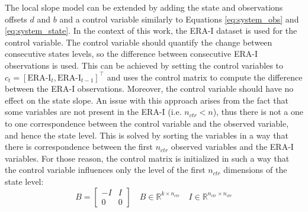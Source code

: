 \documentclass{article}
\begin{document}
The local slope model can be extended by adding the state and observations offsets $d$ and $b$ and a control variable similarly to Equations \ref{eq:system_obs} and \ref{eq:system_state}.
In the context of this work, the ERA-I dataset is used for the control variable. The control variable should quantify the change between consecutive states levels, so the difference between consecutive ERA-I observations is used. This can be achieved by setting the control variables to $c_t = [\text{ERA-I}_t, \text{ERA-I}_{t-1}]^\top$ and uses the control matrix to compute the difference between the ERA-I observations. Moreover, the control variable should have no effect on the state slope. An issue with this approach arises from the fact that some variables are not present in the ERA-I (i.e. $n_{ctr} < n$), thus there is not a one to one correspondence between the control variable and the observed variable, and hence the state level. This is solved by sorting the variables in a way that there is correspondence between the first $n_{ctr}$ observed variables and the ERA-I variables. For those reason, the control matrix is initialized in such a way that the control variable influences only the level of the first $n_{ctr}$ dimensions of the state level:
\[
B = \begin{bmatrix}-I & I \\ 0 & 0\end{bmatrix} \quad B \in \mathbb{R}^{k \times n_{ctr}} \quad I \in \mathbb{R}^{n_{ctr} \times n_{ctr}}
\]










\end{document}
